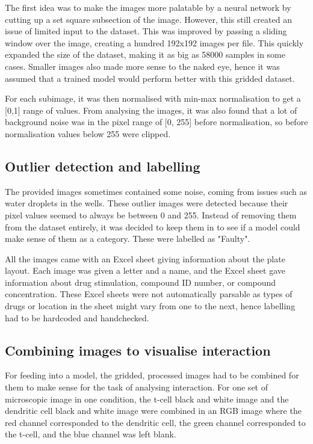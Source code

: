\documentclass{l4proj}
\begin{document}

\bigskip
The first idea was to make the images more palatable by a neural network by cutting up a set square subsection of the image. However, this still created an issue of limited input to the dataset. This was improved by passing a sliding window over the image, creating a hundred 192x192 images per file. This quickly expanded the size of the dataset, making it as big as 58000 samples in some cases. Smaller images also made more sense to the naked eye, hence it was assumed that a trained model would perform better with this gridded dataset.

\bigskip
For each subimage, it was then normalised with min-max normalisation to get a [0,1] range of values. From analysing the images, it was also found that a lot of background noise was in the pixel range of [0, 255] before normalisation, so before normalisation values below 255 were clipped.

\subsection{Outlier detection and labelling}

The provided images sometimes contained some noise, coming from issues such as water droplets in the wells. These outlier images were detected because their pixel values seemed to always be between 0 and 255. Instead of removing them from the dataset entirely, it was decided to keep them in to see if a model could make sense of them as a category. These were labelled as "Faulty".

All the images came with an Excel sheet giving information about the plate layout. Each image was given a letter and a name, and the Excel sheet gave information about drug stimulation, compound ID number, or compound concentration. These Excel sheets were not automatically parsable as types of drugs or location in the sheet might vary from one to the next, hence labelling had to be hardcoded and handchecked.

\subsection{Combining images to visualise interaction}
\bigskip

For feeding into a model, the gridded, processed images had to be combined for them to make sense for the task of analysing interaction. For one set of microscopic image in one condition, the t-cell black and white image and the dendritic cell black and white image were combined in an RGB image where the red channel corresponded to the dendritic cell, the green channel corresponded to the t-cell, and the blue channel was left blank.
\end{document}

